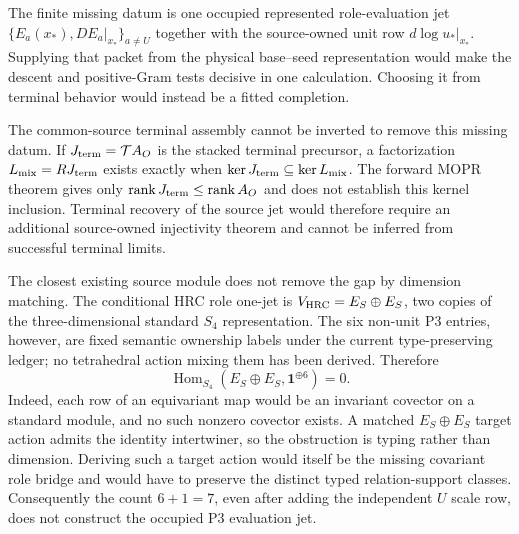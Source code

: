 The finite missing datum is one occupied represented role-evaluation jet
$\{E_a(x_*),DE_a|_{x_*}\}_{a\ne U}$ together with the source-owned unit row
$d\log u_*|_{x_*}$.  Supplying that packet from the physical base--seed
representation would make the descent and positive-Gram tests decisive in
one calculation.  Choosing it from terminal behavior would instead be a
fitted completion.

The common-source terminal assembly cannot be inverted to remove this
missing datum.  If $J_{\rm term}=\mathcal T A_O$ is the stacked terminal
precursor, a factorization $L_{\rm mix}=R J_{\rm term}$ exists exactly when
$\ker J_{\rm term}\subseteq\ker L_{\rm mix}$.  The forward MOPR theorem gives
only $\operatorname{rank}J_{\rm term}\leq\operatorname{rank}A_O$ and does not
establish this kernel inclusion.  Terminal recovery of the source jet would
therefore require an additional source-owned injectivity theorem and cannot
be inferred from successful terminal limits.

The closest existing source module does not remove the gap by dimension
matching.  The conditional HRC role one-jet is
$V_{\rm HRC}=E_S\oplus E_S$, two copies of the three-dimensional standard
$S_4$ representation.  The six non-unit P3 entries, however, are fixed
semantic ownership labels under the current type-preserving ledger; no
tetrahedral action mixing them has been derived.  Therefore
\begin{equation}
\operatorname{Hom}_{S_4}
\left(E_S\oplus E_S,\mathbf1^{\oplus6}\right)=0.
\label{eq:p3hrctypenogo}
\end{equation}
Indeed, each row of an equivariant map would be an invariant covector on a
standard module, and no such nonzero covector exists.  A matched
$E_S\oplus E_S$ target action admits the identity intertwiner, so the
obstruction is typing rather than dimension.  Deriving such a target action
would itself be the missing covariant role bridge and would have to preserve
the distinct typed relation-support classes.  Consequently the count
$6+1=7$, even after adding the independent $U$ scale row, does not construct
the occupied P3 evaluation jet.


